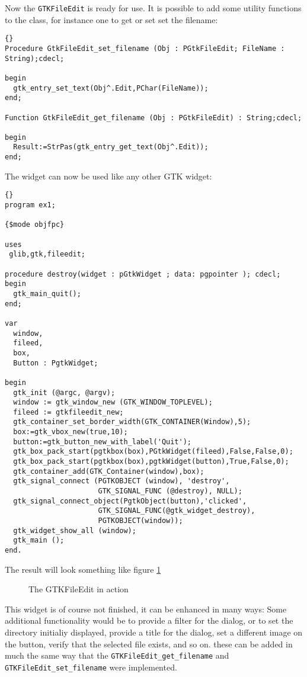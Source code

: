 \documentclass[10pt]{article}
\begin{document}
Now the \lstinline|GTKFileEdit| is ready for use. It is possible to add 
some utility functions to the class, for instance one to get or set set 
the filename:
\begin{lstlisting}{}
Procedure GtkFileEdit_set_filename (Obj : PGtkFileEdit; FileName : String);cdecl;

begin
  gtk_entry_set_text(Obj^.Edit,PChar(FileName));
end;

Function GtkFileEdit_get_filename (Obj : PGtkFileEdit) : String;cdecl;

begin
  Result:=StrPas(gtk_entry_get_text(Obj^.Edit));
end;  
\end{lstlisting}
The widget can now be used like any other GTK widget:
\begin{lstlisting}{}
program ex1;

{$mode objfpc}

uses
 glib,gtk,fileedit;

procedure destroy(widget : pGtkWidget ; data: pgpointer ); cdecl;
begin
  gtk_main_quit();
end;

var
  window,
  fileed,
  box,
  Button : PgtkWidget;
      
begin
  gtk_init (@argc, @argv);
  window := gtk_window_new (GTK_WINDOW_TOPLEVEL);
  fileed := gtkfileedit_new;
  gtk_container_set_border_width(GTK_CONTAINER(Window),5);
  box:=gtk_vbox_new(true,10);
  button:=gtk_button_new_with_label('Quit');
  gtk_box_pack_start(pgtkbox(box),PGtkWidget(fileed),False,False,0);
  gtk_box_pack_start(pgtkbox(box),pgtkWidget(button),True,False,0);
  gtk_container_add(GTK_Container(window),box);
  gtk_signal_connect (PGTKOBJECT (window), 'destroy',
                      GTK_SIGNAL_FUNC (@destroy), NULL);
  gtk_signal_connect_object(PgtkObject(button),'clicked',
                      GTK_SIGNAL_FUNC(@gtk_widget_destroy),
                      PGTKOBJECT(window));
  gtk_widget_show_all (window);
  gtk_main ();
end.
\end{lstlisting}
The result will look something like figure \ref{fig:fileedit}

\begin{figure}[h]
\begin{center}
\caption{The GTKFileEdit in action}\label{fig:fileedit}
\vspace{3mm}
\end{center}
\end{figure}    

This widget is of course not finished, it can be enhanced in many ways:
Some additional functionality would be to provide a filter for the dialog,
or to set the directory initialiy displayed, provide a title for the dialog,
set a different image on the button, verify that the selected file exists, 
and so on. these can be added in much the same way that the
\lstinline|GTKFileEdit_get_filename| and
\lstinline|GTKFileEdit_set_filename| were implemented.
\end{document}
